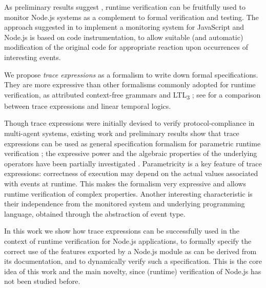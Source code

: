 As preliminary results suggest \cite{TowardsIoT17}, runtime verification can be fruitfully used to monitor Node.js systems as a complement to formal verification and testing.
The approach suggested in \cite{TowardsIoT17} to implement a monitoring system for JavaScript and Node.js is based on code instrumentation, to allow suitable (and automatic) modification of the original code for appropriate reaction upon occurrences of interesting events.

We propose \emph{trace expressions} \cite{ancona2016comparing} as a formalism to write down formal specifications.
They are more expressive than other formalisms commonly adopted for runtime verification, as
attributed context-free grammars \cite{de2014combining} and LTL\textsubscript{3} \cite{ltl3}; see \cite{AnconaFM16} for a comparison between trace expressions and linear temporal logics.

Though trace expressions were initially devised to verify protocol-compliance in multi-agent systems, existing work and preliminary results show that trace expressions can be used as general specification formalism for parametric runtime verification \cite{ParametricJava17, TowardsIoT17};
the expressive power and the algebraic properties of the underlying operators have been partially investigated \cite{ParametricJava17,ancona2016comparing}.
Parametricity is a key feature of trace expressions: correctness of execution may depend on the actual values associated with events at runtime.
This makes the formalism very expressive and allows runtime verification of complex properties.
Another interesting characteristic is their independence from the monitored system and underlying programming language,
obtained through the abstraction of event type.

In this work we show how trace expressions can be successfully used in the context of runtime verification for
Node.js applications, to formally specify the correct use of the features exported by a Node.js module as
can be derived from its documentation, and to dynamically verify such a specification.
This is the core idea of this work and the main novelty, since (runtime) verification of Node.js has not been studied before.

